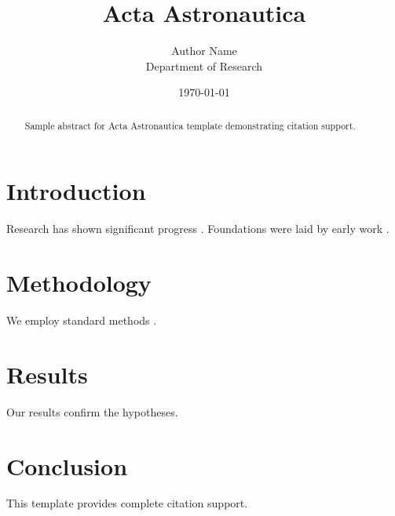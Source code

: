 \documentclass{aastex63}
\title{Acta Astronautica}
\author{Author Name \\ \small Department of Research}
\date{\today}
\begin{document}
\maketitle

\begin{abstract}
Sample abstract for Acta Astronautica template demonstrating citation support.
\end{abstract}

\section{Introduction}
Research has shown significant progress \citep{einstein1905}. Foundations were laid by early work \citep{turing1950}.

\section{Methodology}
We employ standard methods \citep{knuth1984}.

\section{Results}
Our results confirm the hypotheses.

\section{Conclusion}
This template provides complete citation support.



\end{document}
